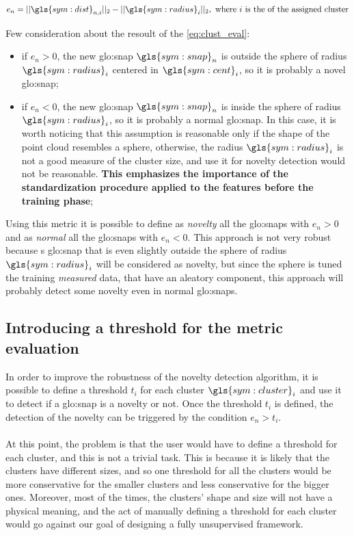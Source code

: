 \begin{equation}
  \label{eq:clust_eval}
  e_{n} = ||\gls{sym:dist}_{n,i}||_2 - ||\gls{sym:radius}_{i}||_2, \text{ where $i$ is the of the assigned cluster}
\end{equation}

Few consideration about the resoult of the \autoref{eq:clust_eval}:
\begin{itemize}
  \item if $e_{n} > 0$, the new {\gls{glo:snap}} $\gls{sym:snap}_n$ is outside the sphere of radius $\gls{sym:radius}_i$ centered in $\gls{sym:cent}_i$, so it is probably a novel {\gls{glo:snap}};
  \item if $e_{n} < 0$, the new {\gls{glo:snap}} $\gls{sym:snap}_n$ is inside the sphere of radius $\gls{sym:radius}_i$, so it is probably a normal {\gls{glo:snap}}. In this case, it is worth noticing that this assumption is reasonable only if the shape of the point cloud resembles a sphere, otherwise, the radius $\gls{sym:radius}_i$ is not a good measure of the cluster size, and use it for novelty detection would not be reasonable. \textbf{This emphasizes the importance of the standardization procedure applied to the features before the training phase};
\end{itemize}



Using this metric it is possible to define as \emph{novelty} all the {\gls{glo:snap}}s with $e_{n} > 0$ and as \emph{normal} all the {\gls{glo:snap}}s with $e_{n} < 0$. This approach is not very robust because s {\gls{glo:snap}} that is even slightly outside the sphere of radius $\gls{sym:radius}_i$ will be considered as novelty, but since the sphere is tuned the training \emph{measured} data, that have an aleatory component, this approach will probably detect some novelty even in normal {\gls{glo:snap}}s.

\subsection{Introducing a threshold for the metric evaluation}
\label{sec:clust_threshold}
In order to improve the robustness of the novelty detection algorithm, it is possible to define a threshold ${t}_i$ for each cluster $\gls{sym:cluster}_i$ and use it to detect if a {\gls{glo:snap}} is a novelty or not. Once the threshold ${t}_i$ is defined, the detection of the novelty can be triggered by the condition $e_{n} > {t}_i$.

\paragraph*{}
At this point, the problem is that the user would have to define a threshold for each cluster, and this is not a trivial task. This is because it is likely that the clusters have different sizes, and so one threshold for all the clusters would be more conservative for the smaller clusters and less conservative for the bigger ones. Moreover, most of the times, the clusters' shape and size will not have a physical meaning, and the act of manually defining a threshold for each cluster would go against our goal of designing a fully unsupervised framework.

